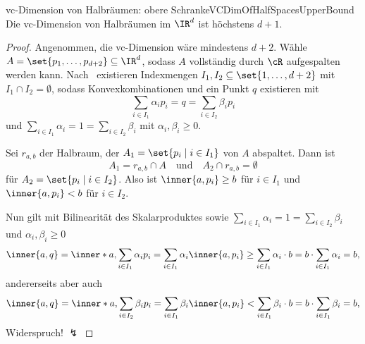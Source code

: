 \documentclass[language=ngerman,algolist,acrolist]{TemplateLecture}
\begin{document}
\begin{thm}{\acs{vc}-Dimension von Halbräumen: obere Schranke}{VCDimOfHalfSpacesUpperBound}
    Die \ac{vc}-Dimension von Halbräumen im $\IR^d$ ist höchstens $d + 1$.
\end{thm}
\begin{proof}
    Angenommen, die \ac{vc}-Dimension wäre mindestens $d + 2$. Wähle $A = \set{p_1, \ldots, p_{d + 2}} \subseteq \IR^d$, sodass $A$ vollständig durch $\cR$ aufgespalten werden kann. Nach~ existieren Indexmengen $I_1, I_2 \subseteq \set{1,\ldots,d + 2}$ mit $I_1 \cap I_2 = \emptyset$, sodass Konvexkombinationen und ein Punkt $q$ existieren mit 
    \begin{equation*}
        \sum_{i \in I_1} \alpha_i p_i = q = \sum_{i \in I_2} \beta_i p_i
    \end{equation*}
    und $\sum_{i \in I_1} \alpha_i = 1 = \sum_{i \in I_2} \beta_i$ mit $\alpha_i, \beta_i \geq 0$.

    Sei $r_{a, b}$ der Halbraum, der $A_1 = \set{p_i \mid i \in I_1}$ von $A$ abspaltet. Dann ist 
    \begin{equation*}
        A_1 = r_{a, b} \cap A \quad \text{und} \quad A_2 \cap r_{a, b} = \emptyset
    \end{equation*}
    für $A_2 = \set{p_i \mid i \in I_2}$. Also ist $\inner{a, p_i} \geq b$ für $i \in I_1$ und $\inner{a, p_i} < b$ für $i \in I_2$.

    Nun gilt mit Bilinearität des Skalarproduktes sowie $\sum_{i \in I_1}\alpha_i = 1 = \sum_{i \in I_2} \beta_i$ und $\alpha_i, \beta_i \geq 0$ 
    \begin{equation*}
        \inner{a, q} = \inner*{a, \sum_{i \in I_1} \alpha_i p_i} =  \sum_{i \in I_1} \alpha_i \inner{a, p_i} \geq \sum_{i \in I_1} \alpha_i \cdot b = b \cdot \sum_{i \in I_1} \alpha_i = b,
    \end{equation*}
    andererseits aber auch 
    \begin{equation*}
        \inner{a, q} = \inner*{a, \sum_{i \in I_2} \beta_i p_i} = \sum_{i \in I_1} \beta_i \inner{a, p_i} < \sum_{i \in I_1} \beta_i \cdot b = b \cdot \sum_{i \in I_1} \beta_i = b,
    \end{equation*}
    Widerspruch! $\lightning$
\end{proof}
\end{document}
